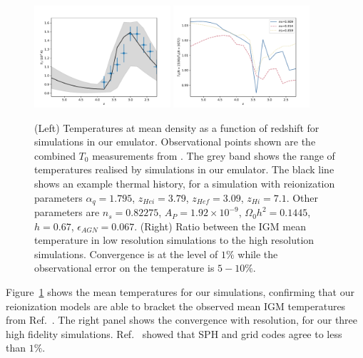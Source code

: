 \documentclass[a4paper,11pt]{article}
\begin{document}
\begin{figure}
\includegraphics[width=0.45\textwidth]{figures/mean-temperature.pdf}
\includegraphics[width=0.45\textwidth]{figures/mean-temperature-resolution.pdf}
 \caption{(Left) Temperatures at mean density as a function of redshift for simulations in our emulator. Observational points shown are the combined $T_0$ measurements from \protect\cite{Gaikwad:2021}.  The grey band shows the range of temperatures realised by simulations in our emulator. The black line shows an example thermal history, for a simulation with reionization parameters $\alpha_q = 1.795$, $z_{Hei} = 3.79$, $z_{Hef} = 3.09$, $z_{Hi} = 7.1$. Other parameters are $n_s = 0.82275$, $A_P = 1.92 \times 10^{-9}$, $\Omega_0 h^2 = 0.1445$, $h = 0.67$, $\epsilon_{AGN} = 0.067$.
 (Right) Ratio between the IGM mean temperature in low resolution simulations to the high resolution simulations. Convergence is at the level of $1\%$ while the observational error on the temperature is $5-10\%$.
}
 \label{fig:meanigmtempdens}
\end{figure}

Figure~\ref{fig:meanigmtempdens} shows the mean temperatures for our simulations, confirming that our reionization models are able to bracket the observed mean IGM temperatures from Ref.~\cite{Gaikwad:2021}. The right panel shows the convergence with resolution, for our three high fidelity simulations.
Ref.~\cite{Chabanier:2022} showed that SPH and grid codes agree to less than $1\%$.
\end{document}
